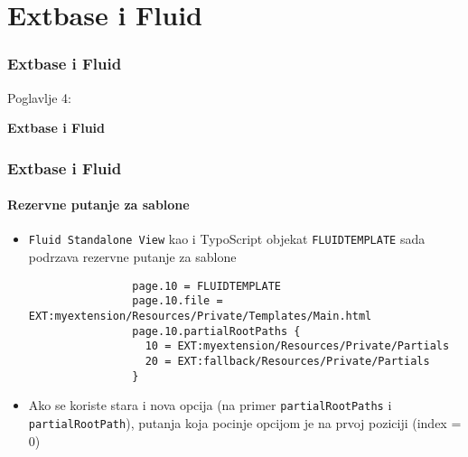 %

\section{Extbase i Fluid}
\begin{frame}[fragile]
	\frametitle{Extbase i Fluid}

	\begin{center}\huge{Poglavlje 4:}\end{center}
	\begin{center}\huge{\color{typo3darkgrey}\textbf{Extbase i Fluid}}\end{center}

\end{frame}


\begin{frame}[fragile]
	\frametitle{Extbase i Fluid}
	\framesubtitle{Rezervne putanje za sablone}

	\lstset{
		basicstyle=\tiny\ttfamily
	}

	\begin{itemize}
		\item \texttt{Fluid Standalone View} kao i TypoScript objekat \texttt{FLUIDTEMPLATE} sada podrzava rezervne putanje za sablone

			\begin{lstlisting}
				page.10 = FLUIDTEMPLATE
				page.10.file = EXT:myextension/Resources/Private/Templates/Main.html
				page.10.partialRootPaths {
				  10 = EXT:myextension/Resources/Private/Partials
				  20 = EXT:fallback/Resources/Private/Partials
				}
			\end{lstlisting}

		\item Ako se koriste stara i nova opcija (na primer \texttt{partialRootPaths} i \texttt{partialRootPath}),
			putanja koja pocinje opcijom je na prvoj poziciji (index = 0)

	\end{itemize}

\end{frame}

